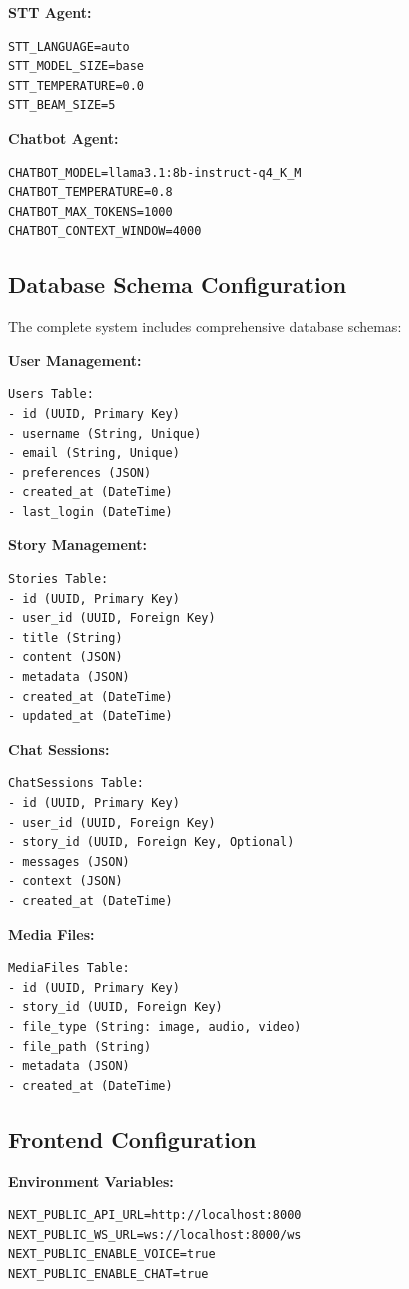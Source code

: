 {\textbf{STT Agent:}
\begin{verbatim}
STT_LANGUAGE=auto
STT_MODEL_SIZE=base
STT_TEMPERATURE=0.0
STT_BEAM_SIZE=5
\end{verbatim}

\textbf{Chatbot Agent:}
\begin{verbatim}
CHATBOT_MODEL=llama3.1:8b-instruct-q4_K_M
CHATBOT_TEMPERATURE=0.8
CHATBOT_MAX_TOKENS=1000
CHATBOT_CONTEXT_WINDOW=4000
\end{verbatim}

\subsection{Database Schema Configuration}
The complete system includes comprehensive database schemas:

\textbf{User Management:}
\begin{verbatim}
Users Table:
- id (UUID, Primary Key)
- username (String, Unique)
- email (String, Unique)
- preferences (JSON)
- created_at (DateTime)
- last_login (DateTime)
\end{verbatim}

\textbf{Story Management:}
\begin{verbatim}
Stories Table:
- id (UUID, Primary Key)
- user_id (UUID, Foreign Key)
- title (String)
- content (JSON)
- metadata (JSON)
- created_at (DateTime)
- updated_at (DateTime)
\end{verbatim}

\textbf{Chat Sessions:}
\begin{verbatim}
ChatSessions Table:
- id (UUID, Primary Key)
- user_id (UUID, Foreign Key)
- story_id (UUID, Foreign Key, Optional)
- messages (JSON)
- context (JSON)
- created_at (DateTime)
\end{verbatim}

\textbf{Media Files:}
\begin{verbatim}
MediaFiles Table:
- id (UUID, Primary Key)
- story_id (UUID, Foreign Key)
- file_type (String: image, audio, video)
- file_path (String)
- metadata (JSON)
- created_at (DateTime)
\end{verbatim}

\subsection{Frontend Configuration}
\textbf{Environment Variables:}
\begin{verbatim}
NEXT_PUBLIC_API_URL=http://localhost:8000
NEXT_PUBLIC_WS_URL=ws://localhost:8000/ws
NEXT_PUBLIC_ENABLE_VOICE=true
NEXT_PUBLIC_ENABLE_CHAT=true
\end{verbatim}

}
